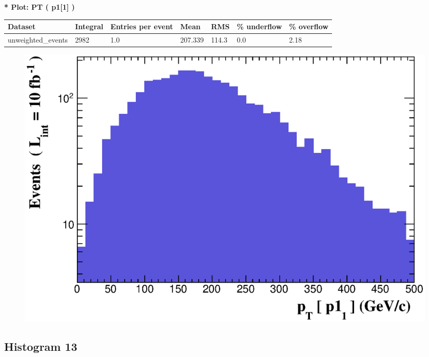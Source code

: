 \documentclass[a4paper, 10pt]{article}
\begin{document}
\textbf{* Plot: PT ( p1[1] ) }\\
   \begin{table}[H]
  \begin{center}
    \begin{tabular}{|m{23.0mm}|m{23.0mm}|m{18.0mm}|m{19.0mm}|m{19.0mm}|m{19.0mm}|m{19.0mm}|}
      \hline
      {\cellcolor{yellow}         Dataset}& {\cellcolor{yellow}         Integral}& {\cellcolor{yellow}         Entries per event}& {\cellcolor{yellow}         Mean}& {\cellcolor{yellow}         RMS}& {\cellcolor{yellow}         \% underflow}& {\cellcolor{yellow}         \% overflow}\\
      \hline
      {\cellcolor{white}         unweighted\_events}& {\cellcolor{white}         2982}& {\cellcolor{white}         1.0}& {\cellcolor{white}         207.339}& {\cellcolor{white}         114.3}& {\cellcolor{green}         0.0}& {\cellcolor{green}         2.18}\\
\hline
    \end{tabular}
  \end{center}
\end{table}

\begin{figure}[H]
  \begin{center}
    \includegraphics[scale=0.45]{selection_11.eps}\\
\caption{   }
  \end{center}
\end{figure}
      \newpage
\subsection{ Histogram 13}
\end{document}
